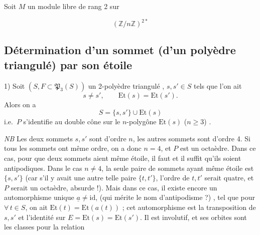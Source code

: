 \documentclass[11pt,a4paper]{article}
\begin{document}
Soit $M$ un module libre de rang 2 sur \ill{}

\[
(\mathbb{Z}/n\mathbb{Z})^{2*}
\]

\subsection*{Détermination d'un sommet (d'un polyèdre triangulé) par son étoile}

1) Soit  $(S,F\subset\mathfrak{P}_3(S))$ un 2-polyèdre triangulé , $s,s'\in S$
tels que \struck{\ill{}} l'on ait
\[
s\neq s',\qquad \mathrm{Et}(s)=\mathrm{Et}(s') .
\]
Alors on a
\[
S=\{s,s'\}\cup\mathrm{Et}(s)
\]
i.e.\ $P$ s'identifie au double cône sur le $n$-polygône $\mathrm{Et}(s)$
($n\geqslant3$) .



\emph{NB} Les deux sommets $s,s'$ sont d'ordre $n$, les autres sommets sont d'ordre 4. Si tous les
sommets ont même ordre, on a donc $n=4$, et $P$ est un octaèdre. Dans ce cas, pour que deux
sommets aient même étoile, il faut et il suffit qu'ils soient antipodiques. Dans le cas $n\neq4$,
la seule paire de sommets ayant même étoile est $\{s,s'\}$ (car \struck{\ill{}} s'il y avait
une \struck{\ill{}} autre telle paire $\{t,t'\}$,  l'ordre de $t,t'$ serait
quatre, et $P$ serait un octaèdre, absurde !). Mais dans ce cas, il existe encore un
automorphisme unique $\underline{a}\neq\mathrm{id}$, (qui mérite le nom d'antipodisme ?) , tel
que pour \struck{\ill{}} $\forall\, t\in S$, on ait $\mathrm{Et}(t)=\mathrm{Et}(a(t))$ ;
cet automorphisme est la transposition de $s,s'$ et l'identité sur
$E=\mathrm{Et}(s)=\mathrm{Et}(s')$. Il est involutif, et ses orbites sont les classes pour la
relation
\end{document}
